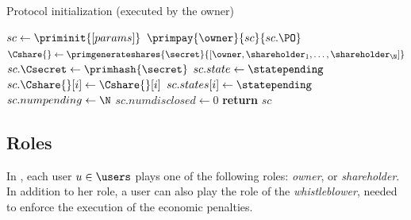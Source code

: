 \begin{algorithm}[t]
	\caption{Protocol initialization (executed by the owner)}\label{algo:init}
	\begin{algorithmic}[1]
		\vspace{0.6em}
		
		\State $sc\gets \priminit{[params]}$
		\State $\primpay{\owner}{sc}{sc.\PO}$ 
		\State $\Cshare{} \gets \primgenerateshares{\secret}{[\owner, \shareholder_{1}, \ldots, \shareholder_{\N}]}$
		\State $sc.\Csecret\gets \primhash{\secret}$ 
		\State $sc.state\gets \statepending$
		 
		\State $sc.\Cshare{}[i]\gets \Cshare{}[i]$
		\State $sc.states[i]\gets \statepending$
		\EndFor
		\State $sc.numpending\gets \N$
		\State $sc.numdisclosed\gets 0$
		\State \textbf{return} $sc$
		\EndProcedure	
	\end{algorithmic}
\end{algorithm}


\subsection{Roles}

%
In \shortname, each user $u \in \users$ plays one of the following roles: {\em owner}, or {\em shareholder}. In addition to her role, a user can also play the role of the {\em whistleblower}, needed to enforce the execution of the economic penalties.

